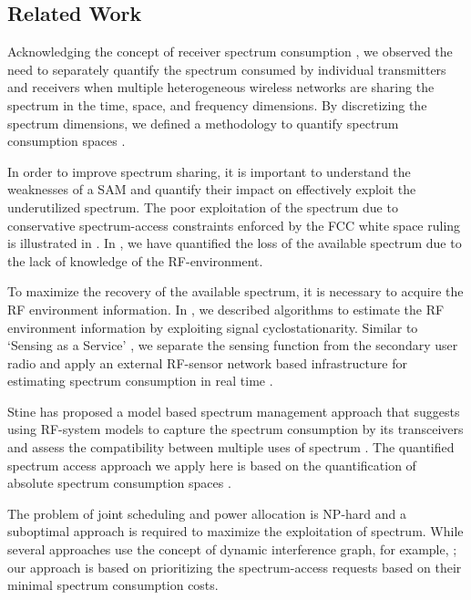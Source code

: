 \documentclass[12pt, draftclsnofoot, onecolumn]{IEEEtran}
\begin{document}
\subsection{Related Work}
Acknowledging the concept of receiver spectrum consumption \cite{itumetrics, gastpar}, we observed the need to separately quantify the spectrum consumed by individual transmitters and receivers when multiple heterogeneous wireless networks are sharing the spectrum in the time, space, and frequency dimensions. By discretizing the spectrum dimensions, we defined a methodology to quantify spectrum consumption spaces \cite{oms1_scq, oms1_sl}. 

In order to improve spectrum sharing, it is important to understand the weaknesses of a SAM and quantify their impact on effectively exploit the underutilized spectrum. The poor exploitation of the spectrum due to conservative spectrum-access constraints enforced by the FCC white space ruling is illustrated in \cite{berk_wsc}. In \cite{oms2_sca}, we have quantified the loss of the available spectrum due to the lack of knowledge of the RF-environment. 

To maximize the recovery of the available spectrum, it is necessary to acquire the RF environment information. In \cite{sgn_icnc}, we described algorithms to estimate the RF environment information by exploiting signal cyclostationarity. Similar to `Sensing as a Service' \cite{saas_weiss}, we separate the sensing function from the secondary user radio and apply an external RF-sensor network based infrastructure for estimating spectrum consumption in real time \cite{oms4_sce}.

Stine has proposed a model based spectrum management approach that suggests using RF-system models to capture the spectrum consumption by its transceivers and assess the compatibility between multiple uses of spectrum \cite{mbsm_stine}. The quantified spectrum access approach we apply here is based on the quantification of absolute spectrum consumption spaces \cite{oms1_sl}.  

The problem of joint scheduling and power allocation is NP-hard \cite{jcpa_nphard} and a suboptimal approach is required to maximize the exploitation of spectrum. While several approaches use the concept of dynamic interference graph, for example, \cite{intf_graph}; our approach is based on prioritizing the spectrum-access requests based on their minimal spectrum consumption costs.
\end{document}
